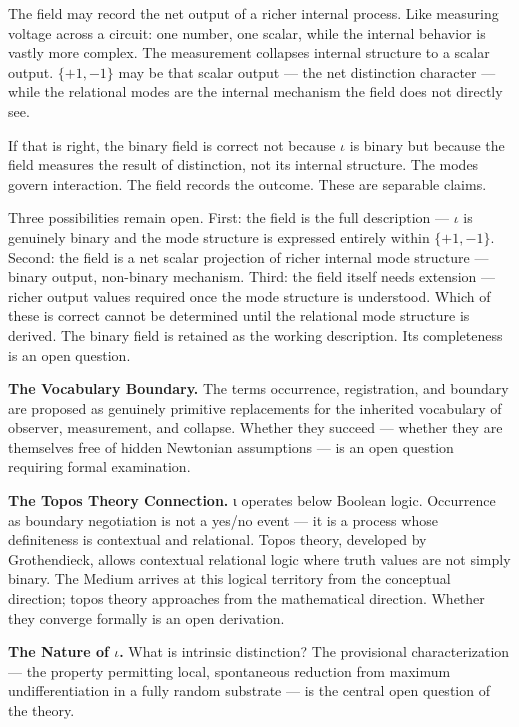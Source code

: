 \documentclass[11pt,letterpaper]{article}
\begin{document}
The field may record the net output of a richer internal process. Like measuring voltage across a circuit: one number, one scalar, while the internal behavior is vastly more complex. The measurement collapses internal structure to a scalar output. \(\{+1,-1\}\) may be that scalar output --- the net distinction character --- while the relational modes are the internal mechanism the field does not directly see.

If that is right, the binary field is correct not because \(\iota\) is binary but because the field measures the result of distinction, not its internal structure. The modes govern interaction. The field records the outcome. These are separable claims.

Three possibilities remain open. First: the field is the full description --- \(\iota\) is genuinely binary and the mode structure is expressed entirely within \(\{+1,-1\}\). Second: the field is a net scalar projection of richer internal mode structure --- binary output, non-binary mechanism. Third: the field itself needs extension --- richer output values required once the mode structure is understood. Which of these is correct cannot be determined until the relational mode structure is derived. The binary field is retained as the working description. Its completeness is an open question.

\textbf{The Vocabulary Boundary.} The terms occurrence, registration, and boundary are proposed as genuinely primitive replacements for the inherited vocabulary of observer, measurement, and collapse. Whether they succeed --- whether they are themselves free of hidden Newtonian assumptions --- is an open question requiring formal examination.

\textbf{The Topos Theory Connection.} ι operates below Boolean logic. Occurrence as boundary negotiation is not a yes/no event --- it is a process whose definiteness is contextual and relational. Topos theory, developed by Grothendieck, allows contextual relational logic where truth values are not simply binary. The Medium arrives at this logical territory from the conceptual direction; topos theory approaches from the mathematical direction. Whether they converge formally is an open derivation.

\textbf{The Nature of \(\iota\).} What is intrinsic distinction? The provisional characterization --- the property permitting local, spontaneous reduction from maximum undifferentiation in a fully random substrate --- is the central open question of the theory.
\end{document}
